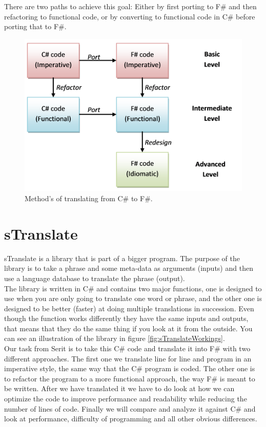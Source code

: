 \documentclass[12pt, a4paper]{article}
\begin{document}
There are two paths to achieve this goal: Either by first porting to F\# and then refactoring to functional code, or by converting to functional code in C\# before porting that to F\#.

\begin{figure}[!h]
    \includegraphics[scale=0.6]{image01}
    \centering
    \caption{Method's of translating from C\# to F\#.}
\end{figure}



\newpage

\section{sTranslate}
sTranslate is a library that is part of a bigger program. The purpose of the library is to take a phrase and some meta-data as arguments (inputs) and then use a language database to translate the phrase (output).\\

The library is written in C\# and contains two major functions, one is designed to use when you are only going to translate one word or phrase, and the other one is designed to be better (faster) at doing multiple translations in succession. Even though the function works differently they have the same inputs and outputs, that means that they do the same thing if you look at it from the outside. You can see an illustration of the library in figure \ref{fig:sTranslateWorkings}.\\


Our task from Serit is to take this C\# code and translate it into F\# with two different approaches. The first one we translate line for line and program in an imperative style, the same way that the C\# program is coded. The other one is to refactor the program to a more functional approach, the way F\# is meant to be written. After we have translated it we have to do look at how we can optimize the code to improve performance and readability while reducing the number of lines of code. Finally we will compare and analyze it against C\# and look at performance, difficulty of programming and all other obvious differences.\\
\end{document}
